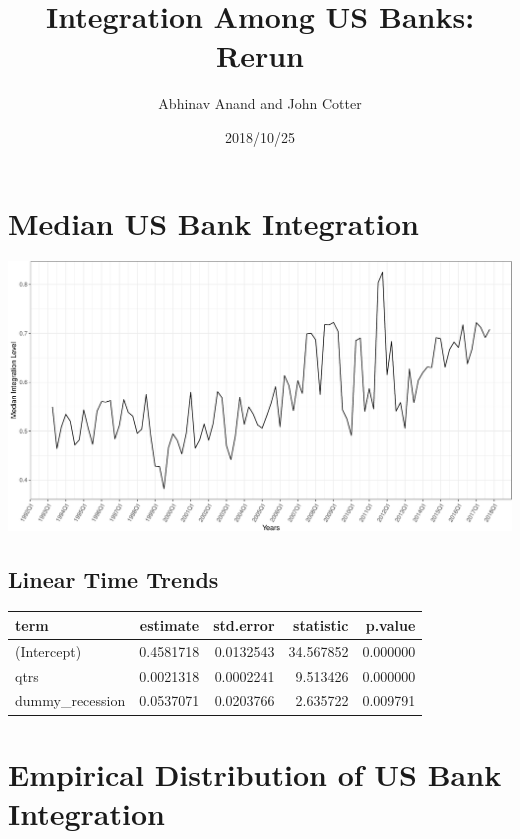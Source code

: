 \documentclass[11pt,]{article}
\title{Integration Among US Banks: Rerun}
\author{Abhinav Anand and John Cotter}
\date{2018/10/25}
\begin{document}
\maketitle

\section{Median US Bank Integration}\label{median-us-bank-integration}

\begin{center}\includegraphics{AC_US_Bank_Int_Results_1_files/figure-latex/med_US_bank_int-1} \end{center}

\subsection{Linear Time Trends}\label{linear-time-trends}

\begin{longtable}[]{@{}lrrrr@{}}
\toprule
term & estimate & std.error & statistic & p.value\tabularnewline
\midrule
\endhead
(Intercept) & 0.4581718 & 0.0132543 & 34.567852 &
0.000000\tabularnewline
qtrs & 0.0021318 & 0.0002241 & 9.513426 & 0.000000\tabularnewline
dummy\_recession & 0.0537071 & 0.0203766 & 2.635722 &
0.009791\tabularnewline
\bottomrule
\end{longtable}

\section{Empirical Distribution of US Bank
Integration}\label{empirical-distribution-of-us-bank-integration}
\end{document}
